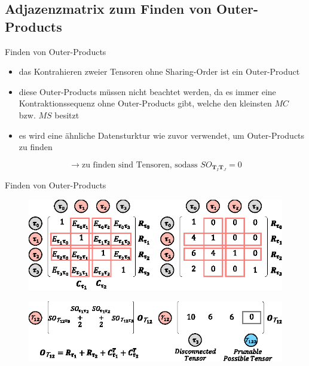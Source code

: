 \documentclass{beamer}
\begin{document}
\subsection{Adjazenzmatrix zum Finden von Outer-Products}
\begin{frame}{Finden von Outer-Products}
	\begin{itemize}
		\item das Kontrahieren zweier Tensoren ohne Sharing-Order ist ein Outer-Product
		\item diese Outer-Products müssen nicht beachtet werden, da es immer eine Kontraktionssequenz ohne Outer-Products gibt, welche den kleinsten $MC$ bzw. $MS$ besitzt\cite{outerProduct}
		\item es wird eine ähnliche Datensturktur wie zuvor verwendet, um Outer-Products zu finden
	\end{itemize} \pause
	\begin{equation*}
		\rightarrow \text{zu finden sind Tensoren, sodass } SO_{\bm{T}_I \bm{T}_J} = 0
	\end{equation*}
\end{frame}

\begin{frame}{Finden von Outer-Products}
	\begin{figure}
		\includegraphics[scale=1.1]{figure_05_e_g}
	\end{figure} \pause
	\begin{figure}
		\includegraphics[scale=1.2]{figure_05_f_h}
	\end{figure}
\end{frame}
\end{document}
